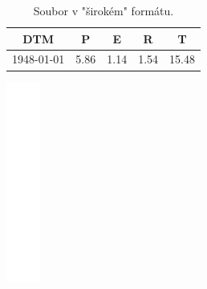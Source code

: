 \documentclass[12pt,]{article}
\begin{document}
\begin{minipage}[c]{0.48\textwidth}
\begin{table}[H]
\begin{tabular}{|ccccc|}
  \hline
DTM & P & E & R & T \\ 
  \hline
1948-01-01 & 5.86 & 1.14 & 1.54 & 15.48 \\ 
   \hline
\end{tabular}
\vspace*{1.5mm}
\caption{Soubor v "širokém" formátu.}
\label{tab3}
\vspace*{12mm}
\end{table}
\end{minipage}\begin{minipage}[c]{0.14\textwidth}
\includegraphics[width=\textwidth]{fig/blank_v}

\end{minipage}
\end{document}
